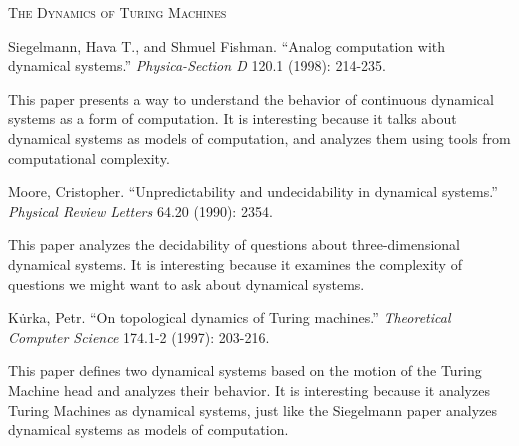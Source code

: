 \documentclass {fkpset}
\begin{document}
	
	\begin{center}
		\vspace{-2.0cm}
		\scshape \LARGE The Dynamics of Turing Machines
		\vspace{1.05cm}
	\end{center}
	
	
	\begin{thebibliography}{widestlabel}
		Siegelmann, Hava T., and Shmuel Fishman. ``Analog computation with dynamical systems.'' \textit{Physica-Section D} 120.1 (1998): 214-235.
		
		This paper presents a way to understand the behavior of continuous dynamical systems as a form of computation. It is interesting because it talks about dynamical systems as models of computation, and analyzes them using tools from computational complexity.
	
		Moore, Cristopher. ``Unpredictability and undecidability in dynamical systems.'' 
		\textit{Physical Review Letters} 64.20 (1990): 2354.
		
		This paper analyzes the decidability of questions about three-dimensional dynamical systems. It is interesting because it examines the complexity of questions we might want to ask about dynamical systems.
		
		K{\.u}rka, Petr. ``On topological dynamics of Turing machines.'' \textit{Theoretical Computer Science} 174.1-2 (1997): 203-216.
		
		This paper defines two dynamical systems based on the motion of the Turing Machine head and analyzes their behavior. It is interesting because it analyzes Turing Machines as dynamical systems, just like the Siegelmann paper analyzes dynamical systems as models of computation. 
		
	\end{thebibliography}
	
\end{document}

